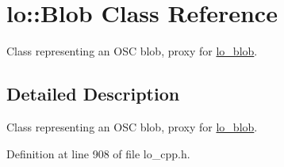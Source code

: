 \hypertarget{classlo_1_1Blob}{\section{lo\+:\+:Blob Class Reference}
\label{classlo_1_1Blob}
}


Class representing an O\+S\+C blob, proxy for \hyperlink{lo__types_8h_a8e780f8c09e3e4dd737fe249f11d16fc}{lo\+\_\+blob}.  




\subsection{Detailed Description}
Class representing an O\+S\+C blob, proxy for \hyperlink{lo__types_8h_a8e780f8c09e3e4dd737fe249f11d16fc}{lo\+\_\+blob}. 

Definition at line 908 of file lo\+\_\+cpp.\+h.

